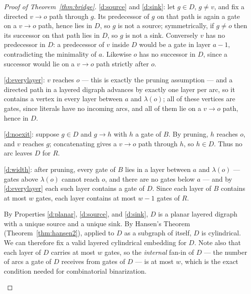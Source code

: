 \documentclass[11pt]{article}
\theoremstyle{definition}
\theoremstyle{remark}
\newcommand{\layer}{\lambda}
\begin{document}
\begin{proof}[Proof of Theorem~\ref{thm:bridge}]
\ref{d:source} and \ref{d:sink}: let $g\in D$, $g\ne v$, and fix a directed
$v\to o$ path through $g$.  Its predecessor of $g$ on that path is again a gate on a
$v\to o$ path, hence lies in $D$, so $g$ is not a source; symmetrically, if $g\ne o$
then its successor on that path lies in $D$, so $g$ is not a sink.  Conversely $v$
has no predecessor in $D$: a predecessor of $v$ inside $D$ would be a gate in layer
$a-1$, contradicting the minimality of $a$.
Likewise $o$ has no successor in $D$, since a successor
would lie on a $v\to o$ path strictly after $o$.

\ref{d:everylayer}: $v$ reaches $o$ --- this is exactly the pruning assumption ---
and a directed path in a layered digraph advances by exactly one layer per arc, so
it contains a vertex in every layer between $a$ and $\layer(o)$; all of these
vertices are gates, since literals have no incoming arcs, and all of them lie on a
$v\to o$ path, hence in $D$.

\ref{d:noexit}: suppose $g\in D$ and $g\to h$ with $h$ a gate of $B$.  By pruning,
$h$ reaches $o$, and $v$ reaches $g$; concatenating gives a $v\to o$ path through
$h$, so $h\in D$.  Thus no arc leaves $D$ for $R$.

\ref{d:width}: after pruning, every gate of $B$ lies in a layer between $a$ and
$\layer(o)$ --- gates above $\layer(o)$ cannot reach $o$, and there are no gates
below $a$ --- and by \ref{d:everylayer} each such layer contains a gate of $D$.
Since each layer of $B$ contains at most $w$ gates, each layer contains at most
$w-1$ gates of $R$.

By Properties \ref{d:planar}, \ref{d:source}, and \ref{d:sink}, $D$ is a planar layered digraph with a unique source and a unique sink. By Hansen's Theorem (Theorem~\ref{thm:hansen2}), applied to $D$ as a subgraph of itself, $D$ is cylindrical. We can therefore fix a valid layered cylindrical embedding for $D$. Note also that each layer of $D$ carries at most $w$ gates, so the \emph{internal} fan-in of $D$ --- the number of arcs a gate of $D$ receives from gates of $D$ --- is at most $w$, which is the exact condition needed for combinatorial binarization.

\begin{figure}[t]
\centering
{}
\end{figure}
\end{proof}
\end{document}
